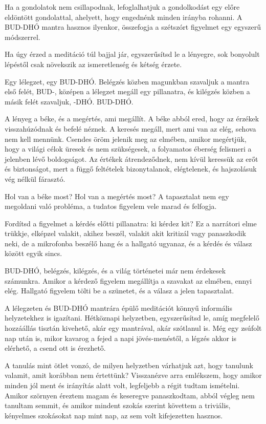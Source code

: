 Ha a gondolatok nem csillapodnak, lefoglalhatjuk a gondolkodást egy
előre eldöntött gondolattal, ahelyett, hogy engednénk minden irányba
rohanni. A BUD-DHÓ mantra hasznos ilyenkor, összefogja a szétszórt
figyelmet egy egyszerű módszerrel.

Ha úgy érzed a meditáció túl bajjal jár, egyszerűsítsd le a lényegre,
sok bonyolult lépéstől csak növekszik az ismeretlenség és kétség érzete.

Egy lélegzet, egy BUD-DHÓ. Belégzés közben magunkban szavaljuk a mantra
első felét, BUD-, középen a lélegzet megáll egy pillanatra, és kilégzés
közben a másik felét szavaljuk, -DHÓ. BUD-DHÓ.

A lényeg a béke, és a megértés, ami megállít. A béke abból ered, hogy az
érzékek visszahúzódnak és befelé néznek. A keresés megáll, mert ami van
az elég, sehova nem kell mennünk. Csendes öröm jelenik meg az elmében,
amikor megértjük, hogy a világi célok üresek és nem szükségesek, a
folyamatos éberség felismeri a jelenben lévő boldogságot. Az értékek
átrendeződnek, nem kívül keressük az erőt és biztonságot, mert a függő
feltételek bizonytalanok, elégtelenek, és hajszolásuk vég nélkül
fárasztó.

Hol van a béke most? Hol van a megértés most? A tapasztalat nem egy
megoldani való probléma, a tudatos figyelem vele marad és felfogja.

Fordítsd a figyelmet a kérdés előtti pillanatra: ki kérdez kit? Ez a
narrátori elme trükkje, elképzel valakit, akihez beszél, valakit akit
kritizál vagy panaszkodik neki, de a mikrofonba beszélő hang és a
hallgató ugyanaz, és a kérdés és válasz között egyik sincs.

BUD-DHÓ, belégzés, kilégzés, és a világ történetei már nem érdekesek
számunkra. Amikor a kérdező figyelem megállítja a szavakat az elmében,
ennyi elég. Hallgató figyelem tölti be a szünetet, és a válasz a jelen
tapasztalat.

A lélegzeten és BUD-DHÓ mantrára épülő meditációt könnyű informális
helyzetekhez is igazítani. Hétköznapi helyzetben, egyszerűsítsd le, amíg
megfelelő hozzáállás tisztán kivehető, akár egy mantrával, akár
szótlanul is. Még egy zsúfolt nap után is, mikor kavarog a fejed a napi
jövés-menéstől, a légzés akkor is elérhető, a csend ott is érezhető.

A tanulás mint ötlet vonzó, de milyen helyzetben várhatjuk azt, hogy
tanulunk valamit, amit korábban nem értettünk? Visszanézve arra
emlékszem, hogy amikor minden jól ment és irányítás alatt volt,
legfeljebb a régit tudtam ismételni. Amikor szörnyen éreztem magam és
keseregve panaszkodtam, abból végleg nem tanultam semmit, és amikor
mindent szokás szerint követtem a triviális, kényelmes szokásokat nap
mint nap, az sem volt kifejezetten hasznos.

